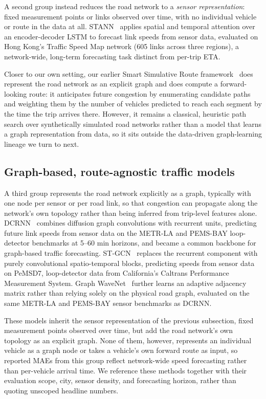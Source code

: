 \documentclass[pdflatex,sn-basic,Numbered]{sn-jnl}%
\begin{document}
A second group instead reduces the road network to a \emph{sensor representation}: fixed measurement points or links observed over time, with no individual vehicle or route in the data at all. STANN~\cite{stann2019} applies spatial and temporal attention over an encoder-decoder LSTM to forecast link speeds from sensor data, evaluated on Hong Kong's Traffic Speed Map network (605 links across three regions), a network-wide, long-term forecasting task distinct from per-trip ETA.

Closer to our own setting, our earlier Smart Simulative Route framework~\cite{SmartSimulativeRoute2025} does represent the road network as an explicit graph and does compute a forward-looking route: it anticipates future congestion by enumerating candidate paths and weighting them by the number of vehicles predicted to reach each segment by the time the trip arrives there. However, it remains a classical, heuristic path search over synthetically simulated road networks rather than a model that learns a graph representation from data, so it sits outside the data-driven graph-learning lineage we turn to next.

\subsection{Graph-based, route-agnostic traffic models}\label{sec:rw-graph-no-route}
A third group represents the road network explicitly as a graph, typically with one node per sensor or per road link, so that congestion can propagate along the network's own topology rather than being inferred from trip-level features alone. DCRNN~\cite{dcrnn2018} combines diffusion graph convolutions with recurrent units, predicting future link speeds from sensor data on the METR-LA and PEMS-BAY loop-detector benchmarks at 5--60 min horizons, and became a common backbone for graph-based traffic forecasting. ST-GCN~\cite{yu2018stgcn} replaces the recurrent component with purely convolutional spatio-temporal blocks, predicting speeds from sensor data on PeMSD7, loop-detector data from California's Caltrans Performance Measurement System. Graph WaveNet~\cite{wu2019graphwavenet} further learns an adaptive adjacency matrix rather than relying solely on the physical road graph, evaluated on the same METR-LA and PEMS-BAY sensor benchmarks as DCRNN.

These models inherit the sensor representation of the previous subsection, fixed measurement points observed over time, but add the road network's own topology as an explicit graph. None of them, however, represents an individual vehicle as a graph node or takes a vehicle's own forward route as input, so reported MAEs from this group reflect network-wide speed forecasting rather than per-vehicle arrival time. We reference these methods together with their evaluation scope, city, sensor density, and forecasting horizon, rather than quoting unscoped headline numbers.
\end{document}
